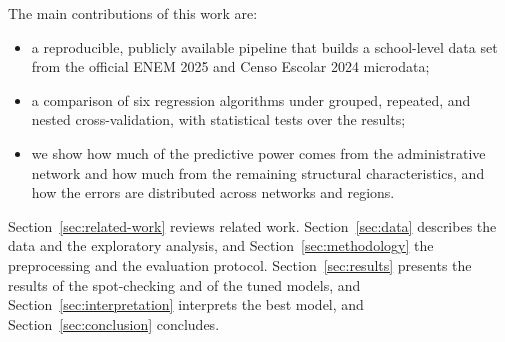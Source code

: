 The main contributions of this work are:
\begin{itemize}
  \item a reproducible, publicly available pipeline that builds a school-level data set from the
        official ENEM 2025 and Censo Escolar 2024 microdata;
  \item a comparison of six regression algorithms under grouped, repeated, and nested
        cross-validation, with statistical tests over the results;
  \item we show how much of the predictive power comes from the administrative network and how
        much from the remaining structural characteristics, and how the errors are distributed
        across networks and regions.
\end{itemize}

Section~\ref{sec:related-work} reviews related work. Section~\ref{sec:data} describes the data and the exploratory analysis, and
Section~\ref{sec:methodology} the preprocessing and the evaluation protocol.
Section~\ref{sec:results} presents the results of the spot-checking and of the tuned models, and
Section~\ref{sec:interpretation} interprets the best model, and Section~\ref{sec:conclusion}
concludes.


